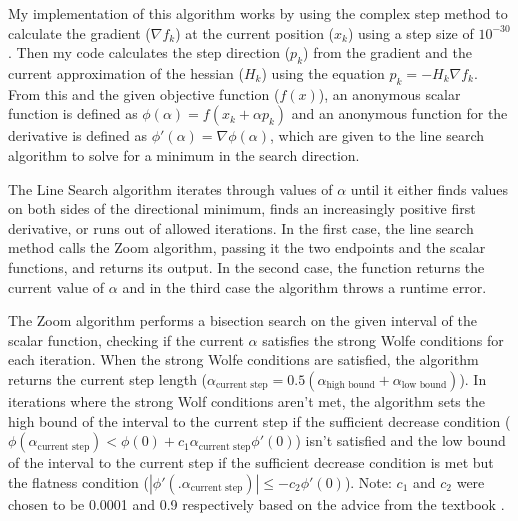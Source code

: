 \documentclass[11pt]{article}%
\begin{document}
My implementation of this algorithm works by using the complex step method to calculate the gradient ($\nabla f_{k}$) at the current position ($x_{k}$) using a step size of $10^{-30}$. Then my code calculates the step direction ($p_{k}$) from the gradient and the current approximation of the hessian ($H_{k}$) using the equation $p_{k}=-H_{k}\nabla f_{k}$. From this and the given objective function ($f(x)$), an anonymous scalar function is defined as $\phi(\alpha)=f(x_{k}+\alpha p_{k})$ and an anonymous function for the derivative is defined as $\phi'(\alpha)=\nabla \phi(\alpha)$, which are given to the line search algorithm to solve for a minimum in the search direction.

The Line Search algorithm iterates through values of $\alpha$ until it either finds values on both sides of the directional minimum, finds an increasingly positive first derivative, or runs out of allowed iterations. In the first case, the line search method calls the Zoom algorithm, passing it the two endpoints and the scalar functions, and returns its output. In the second case, the function returns the current value of $\alpha$ and in the third case the algorithm throws a runtime error.

The Zoom algorithm performs a bisection search on the given interval of the scalar function, checking if the current $\alpha$ satisfies the strong Wolfe conditions for each iteration. When the strong Wolfe conditions are satisfied, the algorithm returns the current step length ($\alpha_{\text{current step}}=0.5(\alpha_{\text{high bound}}+\alpha_{\text{low bound}})$). In iterations where the strong Wolf conditions aren't met, the algorithm sets the high bound of the interval to the current step if the sufficient decrease condition ($\phi(\alpha_{\text{current step}})<\phi(0)+c_{1}\alpha_{\text{current step}}\phi'(0)$) isn't satisfied and the low bound of the interval to the current step if the sufficient decrease condition is met but the flatness condition ($|\phi'(.\alpha_{\text{current step}})|\leq -c_{2}\phi'(0)$). Note: $c_1$ and $c_2$ were chosen to be 0.0001 and 0.9 respectively based on the advice from the textbook \cite{textbook}.
\end{document}
